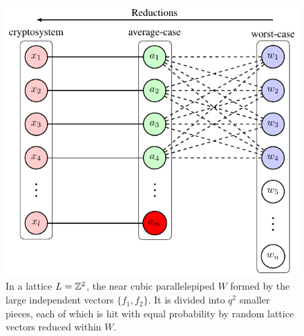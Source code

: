 \documentclass[../main.tex]{subfiles}
\begin{document}

\begin{figure}[hbt!]
    \centering
    \includegraphics[page=16]{images/Lattice_crypto_tikz_folder.pdf}
    \caption{In a lattice $L=\mathbb{Z}^2$, the near cubic parallelepiped $W$ formed by the large independent vectors $\{f_1,f_2\}$. It is divided into $q^2$ smaller pieces, each of which is hit with equal probability by random lattice vectors reduced within $W$.}
    \label{fig:sisIteStep}
\end{figure}
\end{document}
